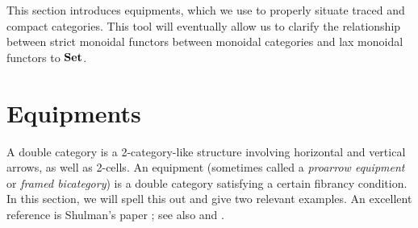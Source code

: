 \documentclass[11pt,oneside,article]{memoir}
\begin{document}
This section introduces equipments, which we use to properly situate traced and compact categories.
This tool will eventually allow us to clarify the relationship between strict monoidal functors
between monoidal categories and lax monoidal functors to $\mathbf{Set}$.

\section{Equipments}
   \label{sec:equipments}

A double category is a 2-category-like structure involving horizontal and vertical arrows, as well
as 2-cells. An equipment (sometimes called a \emph{proarrow equipment} or \emph{framed bicategory})
is a double category satisfying a certain fibrancy condition. In this section, we will spell this
out and give two relevant examples. An excellent reference is Shulman's paper \cite{Shulman}; see also
\cite{Wood1} and \cite{Wood2}.
\end{document}
